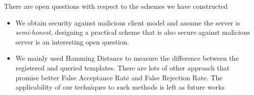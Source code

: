 There are open questions with respect to the schemes we have constructed
\begin{itemize}
\item We obtain security against malicious client model and assume the server is
  \textit{semi-honest}, designing a practical scheme that is also secure against
  malicious server is an interesting open question.
\item We mainly used Hamming Distance to measure the difference between the
  registered and queried templates. There are lots of other approach
  \cite{jain201650} that promise better False Acceptance Rate and False
  Rejection Rate. The applicability of our techniques to such methods is left as
  future works
\end{itemize}

